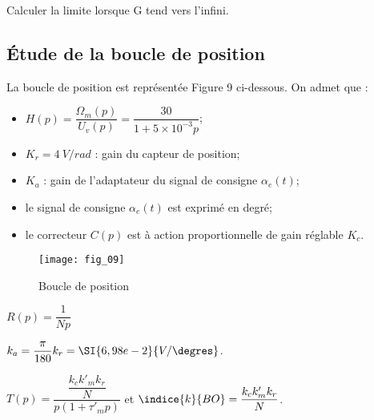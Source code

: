 \ifprof
\begin{corrige}
Calculer la limite lorsque G tend vers l'infini.
\end{corrige}
\else
\fi

\subsection{Étude de la boucle de position}
\ifprof
\else
La boucle de position est représentée Figure 9 ci-dessous. On admet que : 
\begin{itemize}
\item $H(p)=\dfrac{\Omega_m(p)}{U_v(p)} = \dfrac{30}{1+5\times 10^{-3}p}$;
\item $K_r = \SI{4}{V/rad}$ : gain du capteur de position;
\item $K_a$ : gain de l'adaptateur du signal de consigne $\alpha_e(t)$;
\item le signal de consigne $\alpha_e(t)$ est exprimé en degré;
\item le correcteur $C(p)$ est à action proportionnelle de gain réglable $K_c$.
\end{itemize}

\begin{figure}[!h]
\centering
\texttt{[image: fig\_09]}
\caption{Boucle de position\label{kuka:fig:09}}
\end{figure}
\fi

\ifprof
\begin{corrige}
$R(p) = \dfrac{1}{Np}$
\end{corrige}
\else
\fi

\ifprof
\begin{corrige}
$k_a = \dfrac{\pi}{180} k_r = \SI{6,98e-2}{V/\degres}$.
\end{corrige}
\else
\fi

\ifprof
\begin{corrige}
$T(p)=\dfrac{\dfrac{k_c k'_m k_r}{N}}{p(1+\tau'_m p)}$ et $\indice{k}{BO}=\dfrac{k_c k'_m k_r}{N}$.
\end{corrige}
\else
\fi


